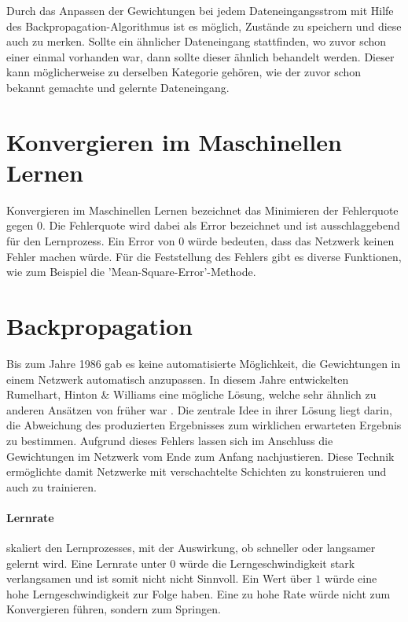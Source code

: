 Durch das Anpassen der Gewichtungen bei jedem Dateneingangsstrom mit Hilfe des Backpropagation-Algorithmus ist es möglich, Zustände zu speichern und diese auch zu merken. 
Sollte ein ähnlicher Dateneingang stattfinden, wo zuvor schon einer einmal vorhanden war, dann sollte dieser ähnlich behandelt werden.
Dieser kann möglicherweise zu derselben Kategorie gehören, wie der zuvor schon bekannt gemachte und gelernte Dateneingang.

\section{Konvergieren im Maschinellen Lernen}
\label{sec:Konvergieren}

Konvergieren im Maschinellen Lernen bezeichnet das Minimieren der Fehlerquote gegen $0$.
Die Fehlerquote wird dabei als Error bezeichnet und ist ausschlaggebend für den Lernprozess.
Ein Error von $0$ würde bedeuten, dass das Netzwerk keinen Fehler machen würde.
Für die Feststellung des Fehlers gibt es diverse Funktionen, wie zum Beispiel die 'Mean-Square-Error'-Methode.

\section{Backpropagation}
\label{sec:Backpropagation}

Bis zum Jahre 1986 gab es keine automatisierte Möglichkeit, die Gewichtungen in einem Netzwerk automatisch anzupassen.
In diesem Jahre entwickelten Rumelhart, Hinton \& Williams eine mögliche Lösung, welche sehr ähnlich zu anderen Ansätzen von früher war \cite{hecht1988theory}.
Die zentrale Idee in ihrer Lösung liegt darin, die Abweichung des produzierten Ergebnisses zum wirklichen erwarteten Ergebnis zu bestimmen. 
Aufgrund dieses Fehlers lassen sich im Anschluss die Gewichtungen im Netzwerk vom Ende zum Anfang nachjustieren. 
Diese Technik ermöglichte damit Netzwerke mit verschachtelte Schichten zu konstruieren und auch zu trainieren.

\paragraph{Lernrate} skaliert den Lernprozesses, mit der Auswirkung, ob schneller oder langsamer gelernt wird.
Eine Lernrate unter $0$ würde die Lerngeschwindigkeit stark verlangsamen und ist somit nicht nicht Sinnvoll. 
Ein Wert über $1$ würde eine hohe Lerngeschwindigkeit zur Folge haben. 
Eine zu hohe Rate würde nicht zum Konvergieren führen, sondern zum Springen.

